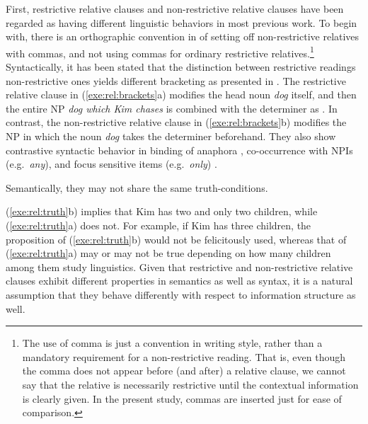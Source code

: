 First, restrictive relative clauses and non-restrictive relative
clauses have been regarded as having different linguistic behaviors in
most previous work.  To begin with, there is an orthographic
convention in  of setting off non-restrictive relatives with
commas, and not using commas for ordinary restrictive
relatives.\footnote{The use of comma is just
a convention in writing style, rather than a mandatory requirement for
a non-restrictive reading. That is, even though the comma does not
appear before (and after) a relative clause, we cannot say that the
relative is necessarily restrictive until the contextual information
is clearly given. In the present study, commas are inserted just for ease of
  comparison.} Syntactically, it has been stated that the distinction
between restrictive readings \vs non-restrictive ones yields different
bracketing as presented in . The restrictive relative clause in (\ref{exe:rel:brackets}a)
modifies the head noun \textit{dog} itself, and then the entire NP
\textit{dog which Kim chases} is combined with the determiner as
.  In contrast, the non-restrictive relative
clause in (\ref{exe:rel:brackets}b) modifies the NP in which the noun
\textit{dog} takes the determiner beforehand.  They also show
contrastive syntactic behavior in binding of anaphora
\citep{emonds:79}, co-occurrence with NPIs (e.g.\ \textit{any}), and
focus sensitive items (e.g.\ \textit{only}) \citep{fabb:90}.






\noindent Semantically, they may not share the same truth-conditions.




\noindent (\ref{exe:rel:truth}b) implies that Kim has two and only two
children, while (\ref{exe:rel:truth}a) does not. For example, if Kim
has three children, the proposition of (\ref{exe:rel:truth}b) would
not be felicitously used, whereas that of (\ref{exe:rel:truth}a) may
or may not be true depending on how many children among them study
linguistics.  Given that restrictive and non-restrictive relative
clauses exhibit different properties in semantics as well as syntax,
it is a natural assumption that they behave differently with respect
to information structure as well.



